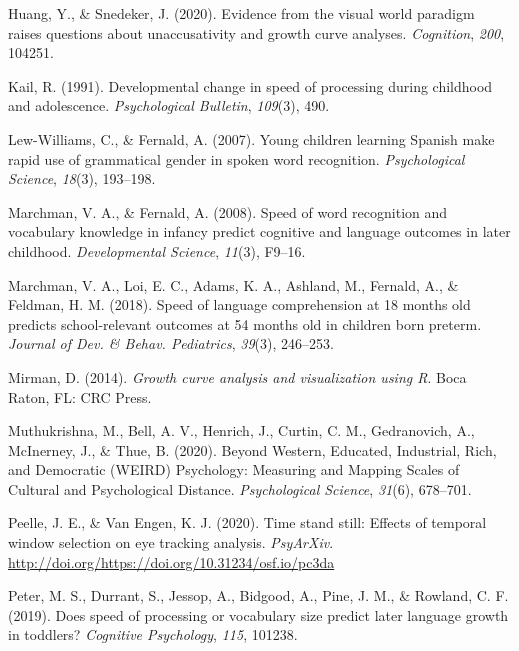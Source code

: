 \documentclass[10pt, letterpaper]{article}
\begin{document}
\leavevmode\hypertarget{ref-Huang2020}{}%
Huang, Y., \& Snedeker, J. (2020). Evidence from the visual world
paradigm raises questions about unaccusativity and growth curve
analyses. \emph{Cognition}, \emph{200}, 104251.

\leavevmode\hypertarget{ref-kail1991}{}%
Kail, R. (1991). Developmental change in speed of processing during
childhood and adolescence. \emph{Psychological Bulletin}, \emph{109}(3),
490.

\leavevmode\hypertarget{ref-Lew-Williams2007}{}%
Lew-Williams, C., \& Fernald, A. (2007). Young children learning Spanish
make rapid use of grammatical gender in spoken word recognition.
\emph{Psychological Science}, \emph{18}(3), 193--198.

\leavevmode\hypertarget{ref-Marchman2008}{}%
Marchman, V. A., \& Fernald, A. (2008). Speed of word recognition and
vocabulary knowledge in infancy predict cognitive and language outcomes
in later childhood. \emph{Developmental Science}, \emph{11}(3), F9--16.

\leavevmode\hypertarget{ref-Marchman2018}{}%
Marchman, V. A., Loi, E. C., Adams, K. A., Ashland, M., Fernald, A., \&
Feldman, H. M. (2018). Speed of language comprehension at 18 months old
predicts school-relevant outcomes at 54 months old in children born
preterm. \emph{Journal of Dev. \& Behav. Pediatrics}, \emph{39}(3),
246--253.

\leavevmode\hypertarget{ref-Mirman2014}{}%
Mirman, D. (2014). \emph{Growth curve analysis and visualization using
R}. Boca Raton, FL: CRC Press.

\leavevmode\hypertarget{ref-Muthukrishna2020}{}%
Muthukrishna, M., Bell, A. V., Henrich, J., Curtin, C. M., Gedranovich,
A., McInerney, J., \& Thue, B. (2020). Beyond Western, Educated,
Industrial, Rich, and Democratic (WEIRD) Psychology: Measuring and
Mapping Scales of Cultural and Psychological Distance.
\emph{Psychological Science}, \emph{31}(6), 678--701.

\leavevmode\hypertarget{ref-Peelle2020}{}%
Peelle, J. E., \& Van Engen, K. J. (2020). Time stand still: Effects of
temporal window selection on eye tracking analysis. \emph{PsyArXiv}.
\url{http://doi.org/https://doi.org/10.31234/osf.io/pc3da}

\leavevmode\hypertarget{ref-peter2019}{}%
Peter, M. S., Durrant, S., Jessop, A., Bidgood, A., Pine, J. M., \&
Rowland, C. F. (2019). Does speed of processing or vocabulary size
predict later language growth in toddlers? \emph{Cognitive Psychology},
\emph{115}, 101238.
\end{document}
